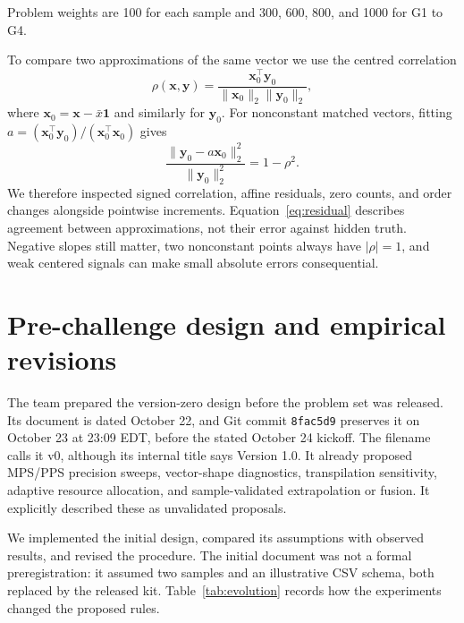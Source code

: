 \documentclass[11pt]{article}
\newcommand{\file}[1]{\nolinkurl{#1}}
\begin{document}
Problem weights are 100 for each sample and 300, 600, 800, and 1000 for G1 to G4.\cite{rules}

To compare two approximations of the same vector we use the centred correlation
\begin{equation}
 \rho(\mathbf x,\mathbf y)=
 \frac{\mathbf x_0^\top\mathbf y_0}{\|\mathbf x_0\|_2\|\mathbf y_0\|_2},
 \label{eq:rho}
\end{equation}
where $\mathbf x_0=\mathbf x-\bar x\mathbf1$ and similarly for $\mathbf y_0$. For nonconstant matched vectors, fitting $a=(\mathbf x_0^\top\mathbf y_0)/(\mathbf x_0^\top\mathbf x_0)$ gives
\begin{equation}
 \frac{\|\mathbf y_0-a\mathbf x_0\|_2^2}{\|\mathbf y_0\|_2^2}=1-\rho^2.
 \label{eq:residual}
\end{equation}
We therefore inspected signed correlation, affine residuals, zero counts, and order changes alongside pointwise increments. Equation~\eqref{eq:residual} describes agreement between approximations, not their error against hidden truth. Negative slopes still matter, two nonconstant points always have $|\rho|=1$, and weak centered signals can make small absolute errors consequential.

\newpage
\section{Pre-challenge design and empirical revisions}
The team prepared the version-zero design before the problem set was released. Its document is dated October 22, and Git commit \file{8fac5d9} preserves it on October 23 at 23:09 EDT, before the stated October 24 kickoff. The filename calls it v0, although its internal title says Version 1.0. It already proposed MPS/PPS precision sweeps, vector-shape diagnostics, transpilation sensitivity, adaptive resource allocation, and sample-validated extrapolation or fusion. It explicitly described these as unvalidated proposals.\cite{design}

We implemented the initial design, compared its assumptions with observed results, and revised the procedure. The initial document was not a formal preregistration: it assumed two samples and an illustrative CSV schema, both replaced by the released kit. Table~\ref{tab:evolution} records how the experiments changed the proposed rules.
\end{document}
